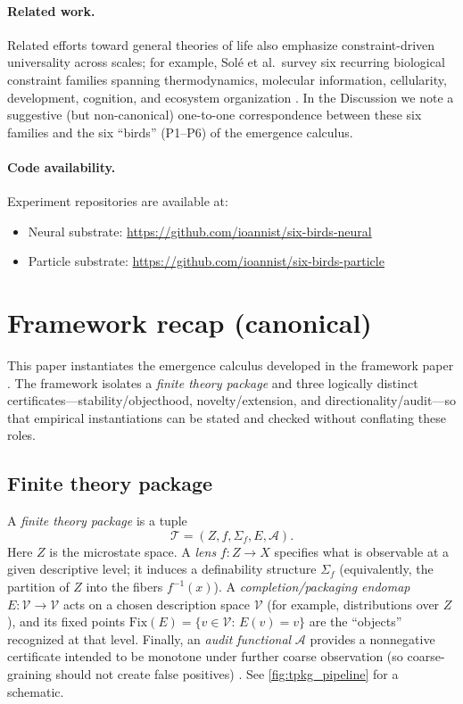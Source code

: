 \documentclass[11pt]{article}
\newcommand{\Tpkg}{\mathcal T}
\newcommand{\Audit}{\mathcal A}
\newcommand{\Sig}{\Sigma}
\begin{document}
\paragraph{Related work.}
Related efforts toward general theories of life also emphasize constraint-driven universality across scales; for example, Sol{\'e} et al.\ survey six recurring biological constraint families spanning thermodynamics, molecular information, cellularity, development, cognition, and ecosystem organization \citep{SoleEtAl2024Constraints}. In the Discussion we note a suggestive (but non-canonical) one-to-one correspondence between these six families and the six ``birds'' (P1--P6) of the emergence calculus.

\paragraph{Code availability.}
Experiment repositories are available at:
\begin{itemize}[noitemsep,topsep=2pt]
\item Neural substrate: \url{https://github.com/ioannist/six-birds-neural}
\item Particle substrate: \url{https://github.com/ioannist/six-birds-particle}
\end{itemize}

\section{Framework recap (canonical)}\label{sec:framework}
This paper instantiates the emergence calculus developed in the framework paper \citep{tsiokos2026sixbirds}. The framework isolates a \emph{finite theory package} and three logically distinct certificates---stability/objecthood, novelty/extension, and directionality/audit---so that empirical instantiations can be stated and checked without conflating these roles.

\subsection{Finite theory package}\label{sec:framework:tpkg}
A \emph{finite theory package} is a tuple
\[
\Tpkg=(Z, f, \Sig_f, E, \Audit).
\]
Here $Z$ is the microstate space. A \emph{lens} $f:Z\to X$ specifies what is observable at a given descriptive level; it induces a definability structure $\Sig_f$ (equivalently, the partition of $Z$ into the fibers $f^{-1}(x)$). A \emph{completion/packaging endomap} $E:\mathcal V\to\mathcal V$ acts on a chosen description space $\mathcal V$ (for example, distributions over $Z$), and its fixed points $\mathrm{Fix}(E)=\{v\in\mathcal V:\,E(v)=v\}$ are the ``objects'' recognized at that level. Finally, an \emph{audit functional} $\Audit$ provides a nonnegative certificate intended to be monotone under further coarse observation (so coarse-graining should not create false positives) \citep{CoverThomas2006}.
See \cref{fig:tpkg_pipeline} for a schematic.
\end{document}
